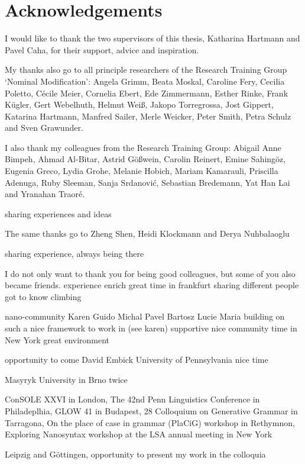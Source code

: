 
\chapter*[Acknowledgements]{Acknowledgements}

I would like to thank the two supervisors of this thesis, Katharina Hartmann and Pavel Caha, for their support, advice and inspiration.

My thanks also go to all principle researchers of the Research Training Group `Nominal Modification':
Angela Grimm,
Beata Moskal,
Caroline Fery,
Cecilia Poletto,
Cécile Meier,
Cornelia Ebert,
Ede Zimmermann,
Esther Rinke,
Frank Kügler,
Gert Webelhuth,
Helmut Weiß,
Jakopo Torregrossa,
Jost Gippert,
Katarina Hartmann,
Manfred Sailer,
Merle Weicker,
Peter Smith,
Petra Schulz and
Sven Grawunder.

I also thank my colleagues from the Research Training Group:
Abigail Anne Bimpeh,
Ahmad Al-Bitar,
Astrid Gößwein,
Carolin Reinert,
Emine Sahingöz,
Eugenia Greco,
Lydia Grohe,
Melanie Hobich,
Mariam Kamarauli,
Priscilla Adenuga,
Ruby Sleeman,
Sanja Srdanović,
Sebastian Bredemann,
Yat Han Lai and
Yranahan Traoré.

sharing experiences and ideas

The same thanks go to
Zheng Shen,
Heidi Klockmann and
Derya Nuhbalaoglu

sharing experience, always being there

I do not only want to thank you for being good colleagues, but some of you also became friends.
experience enrich
great time in frankfurt
sharing
different people
got to know
climbing

nano-community
Karen
Guido
Michal
Pavel
Bartosz
Lucie
Maria
building on such a nice framework to work in (see karen)
supportive
nice community
time in New York
great environment

opportunity to come
David Embick
University of Pennsylvania
nice time

Masyryk University in Brno
twice

ConSOLE XXVI in London,
The 42nd Penn Linguistics Conference in Philadeplhia,
GLOW 41 in Budapest,
28 Colloquium on Generative Grammar in Tarragona,
On the place of case in grammar (PlaCiG) workshop in Rethymnon,
Exploring Nanosyntax workshop at the LSA annual meeting in New York

Leipzig and Göttingen, opportunity to present my work in the colloquia


